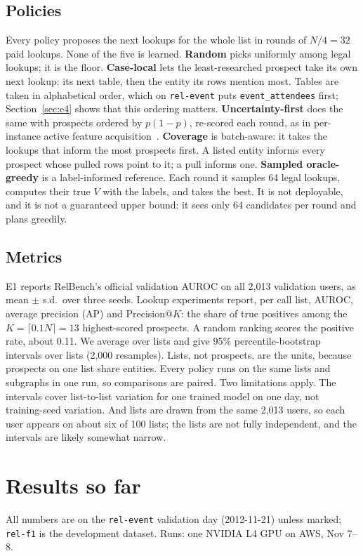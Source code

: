 \documentclass{article}
\begin{document}
\subsection{Policies}
Every policy proposes the next lookups for the whole list in rounds of $N/4 = 32$ paid lookups. None of the five is learned.
\textbf{Random} picks uniformly among legal lookups; it is the floor.
\textbf{Case-local} lets the least-researched prospect take its own next lookup: its next table, then the entity its rows mention most. Tables are taken in alphabetical order, which on \texttt{rel-event} puts \texttt{event\_attendees} first; Section~\ref{sec:e4} shows that this ordering matters.
\textbf{Uncertainty-first} does the same with prospects ordered by $p(1-p)$, re-scored each round, as in per-instance active feature acquisition~\cite{norcliffe2025sefa,valancius2024aco}.
\textbf{Coverage} is batch-aware: it takes the lookups that inform the most prospects first. A listed entity informs every prospect whose pulled rows point to it; a pull informs one.
\textbf{Sampled oracle-greedy} is a label-informed reference. Each round it samples 64 legal lookups, computes their true $V$ with the labels, and takes the best. It is not deployable, and it is not a guaranteed upper bound: it sees only 64 candidates per round and plans greedily.

\subsection{Metrics}
E1 reports RelBench's official validation AUROC on all 2,013 validation users, as mean $\pm$ s.d.\ over three seeds. Lookup experiments report, per call list, AUROC, average precision (AP) and Precision@$K$: the share of true positives among the $K = \lceil 0.1N \rceil = 13$ highest-scored prospects. A random ranking scores the positive rate, about 0.11. We average over lists and give 95\% percentile-bootstrap intervals over lists (2,000 resamples). Lists, not prospects, are the units, because prospects on one list share entities. Every policy runs on the same lists and subgraphs in one run, so comparisons are paired. Two limitations apply. The intervals cover list-to-list variation for one trained model on one day, not training-seed variation. And lists are drawn from the same 2,013 users, so each user appears on about six of 100 lists; the lists are not fully independent, and the intervals are likely somewhat narrow.

\section{Results so far}
All numbers are on the \texttt{rel-event} validation day (2012-11-21) unless marked; \texttt{rel-f1} is the development dataset. Runs: one NVIDIA L4 GPU on AWS, Nov 7--8.
\end{document}
